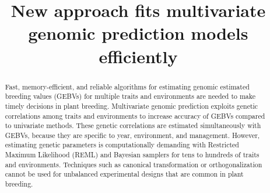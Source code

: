 \documentclass{bmcart}
\begin{document}
\begin{frontmatter}

\begin{fmbox}


\title{ New approach fits multivariate genomic prediction models efficiently }

\author[
   addressref={aff1,aff2},
   corref={aff1,aff2},
   noteref={n1},
   email={alencar.xavier@corteva.com}
]{ }
\author[
   addressref={aff1},
   email={david.habier@corteva.com}
]{ }


\address[id=aff1]{
,
  ,
  ,
  ,
}

\address[id=aff2]{
  ,
  ,
  ,
  ,
}


\begin{artnotes}
\end{artnotes}
\end{fmbox}%

\begin{abstractbox}

\begin{abstract} %

 Fast, memory-efficient, and reliable algorithms for estimating genomic estimated breeding values (GEBVs) for multiple traits and environments are needed to make timely decisions in plant breeding. Multivariate genomic prediction exploits genetic correlations among traits and environments to increase accuracy of GEBVs compared to univariate methods. These genetic correlations are estimated simultaneously with GEBVs, because they are specific to year, environment, and management. However, estimating genetic parameters is computationally demanding with Restricted Maximum Likelihood (REML) and Bayesian samplers for tens to hundreds of traits and environments. Techniques such as canonical transformation or orthogonalization cannot be used for unbalanced experimental designs that are common in plant breeding. 


\end{abstract}
\end{abstractbox}
\end{frontmatter}
\end{document}
